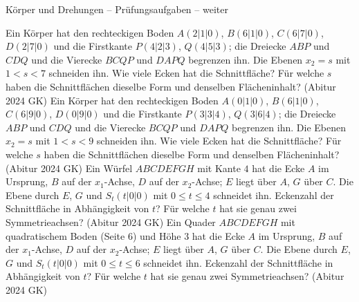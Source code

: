 \begin{aufgabe}{Körper und Drehungen – Prüfungsaufgaben – weiter}
\begin{teile}
\teil Ein Körper hat den rechteckigen Boden $A(2 | 1 | 0)$, $B(6 | 1 | 0)$, $C(6 | 7 | 0)$, $D(2 | 7 | 0)$ und die Firstkante $P(4 | 2 | 3)$, $Q(4 | 5 | 3)$; die Dreiecke $ABP$ und $CDQ$ und die Vierecke $BCQP$ und $DAPQ$ begrenzen ihn. Die Ebenen $x_2 = s$ mit $1 < s < 7$ schneiden ihn. Wie viele Ecken hat die Schnittfläche? Für welche $s$ haben die Schnittflächen dieselbe Form und denselben Flächeninhalt? \hfill (Abitur 2024 GK)
\teil Ein Körper hat den rechteckigen Boden $A(0 | 1 | 0)$, $B(6 | 1 | 0)$, $C(6 | 9 | 0)$, $D(0 | 9 | 0)$ und die Firstkante $P(3 | 3 | 4)$, $Q(3 | 6 | 4)$; die Dreiecke $ABP$ und $CDQ$ und die Vierecke $BCQP$ und $DAPQ$ begrenzen ihn. Die Ebenen $x_2 = s$ mit $1 < s < 9$ schneiden ihn. Wie viele Ecken hat die Schnittfläche? Für welche $s$ haben die Schnittflächen dieselbe Form und denselben Flächeninhalt? \hfill (Abitur 2024 GK)
\teil Ein Würfel $ABCDEFGH$ mit Kante $4$ hat die Ecke $A$ im Ursprung, $B$ auf der $x_1$-Achse, $D$ auf der $x_2$-Achse; $E$ liegt über $A$, $G$ über $C$. Die Ebene durch $E$, $G$ und $S_t(t | 0 | 0)$ mit $0 \le t \le 4$ schneidet ihn. Eckenzahl der Schnittfläche in Abhängigkeit von $t$? Für welche $t$ hat sie genau zwei Symmetrieachsen? \hfill (Abitur 2024 GK)
\teil Ein Quader $ABCDEFGH$ mit quadratischem Boden (Seite $6$) und Höhe $3$ hat die Ecke $A$ im Ursprung, $B$ auf der $x_1$-Achse, $D$ auf der $x_2$-Achse; $E$ liegt über $A$, $G$ über $C$. Die Ebene durch $E$, $G$ und $S_t(t | 0 | 0)$ mit $0 \le t \le 6$ schneidet ihn. Eckenzahl der Schnittfläche in Abhängigkeit von $t$? Für welche $t$ hat sie genau zwei Symmetrieachsen? \hfill (Abitur 2024 GK)
\end{teile}
\end{aufgabe}
